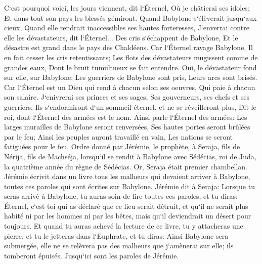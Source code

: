 \verse C`est pourquoi voici, les jours viennent, dit l`Éternel, Où je châtierai ses idoles; Et dans tout son pays les blessés gémiront. 
\verse Quand Babylone s`élèverait jusqu`aux cieux, Quand elle rendrait inaccessibles ses hautes forteresses, J`enverrai contre elle les dévastateurs, dit l`Éternel... 
\verse Des cris s`échappent de Babylone, Et le désastre est grand dans le pays des Chaldéens. 
\verse Car l`Éternel ravage Babylone, Il en fait cesser les cris retentissants; Les flots des dévastateurs mugissent comme de grandes eaux, Dont le bruit tumultueux se fait entendre. 
\verse Oui, le dévastateur fond sur elle, sur Babylone; Les guerriers de Babylone sont pris, Leurs arcs sont brisés. Car l`Éternel est un Dieu qui rend à chacun selon ses oeuvres, Qui paie à chacun son salaire. 
\verse J`enivrerai ses princes et ses sages, Ses gouverneurs, ses chefs et ses guerriers; Ils s`endormiront d`un sommeil éternel, et ne se réveilleront plus, Dit le roi, dont l`Éternel des armées est le nom. 
\verse Ainsi parle l`Éternel des armées: Les larges murailles de Babylone seront renversées, Ses hautes portes seront brûlées par le feu; Ainsi les peuples auront travaillé en vain, Les nations se seront fatiguées pour le feu. 
\verse Ordre donné par Jérémie, le prophète, à Seraja, fils de Nérija, fils de Machséja, lorsqu`il se rendit à Babylone avec Sédécias, roi de Juda, la quatrième année du règne de Sédécias. Or, Seraja était premier chambellan. 
\verse Jérémie écrivit dans un livre tous les malheurs qui devaient arriver à Babylone, toutes ces paroles qui sont écrites sur Babylone. 
\verse Jérémie dit à Seraja: Lorsque tu seras arrivé à Babylone, tu auras soin de lire toutes ces paroles, 
\verse et tu diras: Éternel, c`est toi qui as déclaré que ce lieu serait détruit, et qu`il ne serait plus habité ni par les hommes ni par les bêtes, mais qu`il deviendrait un désert pour toujours. 
\verse Et quand tu auras achevé la lecture de ce livre, tu y attacheras une pierre, et tu le jetteras dans l`Euphrate, 
\verse et tu diras: Ainsi Babylone sera submergée, elle ne se relèvera pas des malheurs que j`amènerai sur elle; ils tomberont épuisés. Jusqu`ici sont les paroles de Jérémie. 

